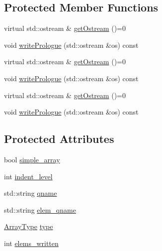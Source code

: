 \subsection*{Protected Member Functions}
\begin{DoxyCompactItemize}
\item 
virtual std\+::ostream \& \mbox{\hyperlink{classXMLStructWriterAPI_1_1XMLArrayWriterBase_a0b692c4435105f1f67e0b6f0516135b6}{get\+Ostream}} ()=0
\item 
void \mbox{\hyperlink{classXMLStructWriterAPI_1_1XMLArrayWriterBase_a7345d02ca5658546b764ed621044c68d}{write\+Prologue}} (std\+::ostream \&os) const
\item 
virtual std\+::ostream \& \mbox{\hyperlink{classXMLStructWriterAPI_1_1XMLArrayWriterBase_a0b692c4435105f1f67e0b6f0516135b6}{get\+Ostream}} ()=0
\item 
void \mbox{\hyperlink{classXMLStructWriterAPI_1_1XMLArrayWriterBase_a7345d02ca5658546b764ed621044c68d}{write\+Prologue}} (std\+::ostream \&os) const
\item 
virtual std\+::ostream \& \mbox{\hyperlink{classXMLStructWriterAPI_1_1XMLArrayWriterBase_a0b692c4435105f1f67e0b6f0516135b6}{get\+Ostream}} ()=0
\item 
void \mbox{\hyperlink{classXMLStructWriterAPI_1_1XMLArrayWriterBase_a7345d02ca5658546b764ed621044c68d}{write\+Prologue}} (std\+::ostream \&os) const
\end{DoxyCompactItemize}
\subsection*{Protected Attributes}
\begin{DoxyCompactItemize}
\item 
bool \mbox{\hyperlink{classXMLStructWriterAPI_1_1XMLArrayWriterBase_a404ef854a3fb879b58182431f042a849}{simple\+\_\+array}}
\item 
int \mbox{\hyperlink{classXMLStructWriterAPI_1_1XMLArrayWriterBase_ac27f8ee3bc74448bce22008dd40bf8da}{indent\+\_\+level}}
\item 
std\+::string \mbox{\hyperlink{classXMLStructWriterAPI_1_1XMLArrayWriterBase_a8f37d964908f9b5b246f49be05e7426b}{qname}}
\item 
std\+::string \mbox{\hyperlink{classXMLStructWriterAPI_1_1XMLArrayWriterBase_ad82542571b1fe5dfe92473a37cdce886}{elem\+\_\+qname}}
\item 
\mbox{\hyperlink{namespaceXMLStructWriterAPI_a2017208be87c77a32bdc19ea2f14d032}{Array\+Type}} \mbox{\hyperlink{classXMLStructWriterAPI_1_1XMLArrayWriterBase_a3cf99febdb592458a83224b027233ed3}{type}}
\item 
int \mbox{\hyperlink{classXMLStructWriterAPI_1_1XMLArrayWriterBase_a0763b71be02a920a6278c5fd18110497}{elems\+\_\+written}}
\end{DoxyCompactItemize}


